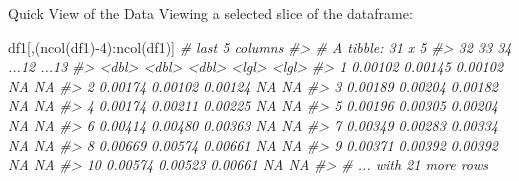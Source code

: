 \documentclass[
  11pt,
  ignorenonframetext,
  svgnames, handout, t]{beamer}
\newenvironment{Shaded}{\begin{snugshade}}{\end{snugshade}}
\newcommand{\CommentTok}[1]{\textcolor[rgb]{0.56,0.35,0.01}{\textit{#1}}}
\newcommand{\DecValTok}[1]{\textcolor[rgb]{0.00,0.00,0.81}{#1}}
\newcommand{\FunctionTok}[1]{\textcolor[rgb]{0.00,0.00,0.00}{#1}}
\newcommand{\NormalTok}[1]{#1}
\newcommand{\SpecialCharTok}[1]{\textcolor[rgb]{0.00,0.00,0.00}{#1}}
\begin{document}
\begin{frame}[fragile]{Quick View of the Data}
\protect\hypertarget{quick-view-of-the-data-4}{}
Viewing a selected slice of the dataframe:

\footnotesize

\begin{Shaded}
\begin{Highlighting}[]
\NormalTok{df1[,(}\FunctionTok{ncol}\NormalTok{(df1)}\SpecialCharTok{{-}}\DecValTok{4}\NormalTok{)}\SpecialCharTok{:}\FunctionTok{ncol}\NormalTok{(df1)]  }\CommentTok{\# last 5 columns}
\CommentTok{\#\textgreater{} \# A tibble: 31 x 5}
\CommentTok{\#\textgreater{}       \textasciigrave{}32\textasciigrave{}    \textasciigrave{}33\textasciigrave{}    \textasciigrave{}34\textasciigrave{} ...12 ...13}
\CommentTok{\#\textgreater{}      \textless{}dbl\textgreater{}   \textless{}dbl\textgreater{}   \textless{}dbl\textgreater{} \textless{}lgl\textgreater{} \textless{}lgl\textgreater{}}
\CommentTok{\#\textgreater{}  1 0.00102 0.00145 0.00102 NA    NA   }
\CommentTok{\#\textgreater{}  2 0.00174 0.00102 0.00124 NA    NA   }
\CommentTok{\#\textgreater{}  3 0.00189 0.00204 0.00182 NA    NA   }
\CommentTok{\#\textgreater{}  4 0.00174 0.00211 0.00225 NA    NA   }
\CommentTok{\#\textgreater{}  5 0.00196 0.00305 0.00204 NA    NA   }
\CommentTok{\#\textgreater{}  6 0.00414 0.00480 0.00363 NA    NA   }
\CommentTok{\#\textgreater{}  7 0.00349 0.00283 0.00334 NA    NA   }
\CommentTok{\#\textgreater{}  8 0.00669 0.00574 0.00661 NA    NA   }
\CommentTok{\#\textgreater{}  9 0.00371 0.00392 0.00392 NA    NA   }
\CommentTok{\#\textgreater{} 10 0.00574 0.00523 0.00661 NA    NA   }
\CommentTok{\#\textgreater{} \# ... with 21 more rows}
\end{Highlighting}
\end{Shaded}

\normalsize
\end{frame}
\end{document}

